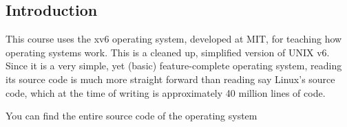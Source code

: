 \subsection{Introduction}
This course uses the xv6 operating system, developed at MIT, for teaching how operating systems work.
This is a cleaned up, simplified version of UNIX v6. Since it is a very simple, yet (basic) feature-complete operating system,
reading its source code is much more straight forward than reading say Linux's source code, which at the time of writing is approximately 40 million lines of code.

You can find the entire source code of the operating system  %
